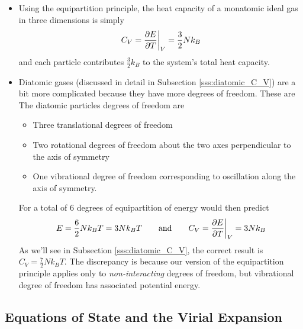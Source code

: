 \documentclass[11pt, a4paper]{article}
\newcommand{\eqtext}[1]{\qquad \text{#1} \qquad}
\begin{document}
\begin{itemize}
	\item Using the equipartition principle, the heat capacity of a monatomic ideal gas in three dimensions is simply
	\begin{equation*}
		C_{V} = \pdv{E}{T}\bigg|_{V} = \frac{3}{2}N k_{B}
	\end{equation*}
	and each particle contributes $ \frac{3}{2} k_{B} $ to the system's total heat capacity.
	
	\item Diatomic gases (discussed in detail in Subsection \ref{sss:diatomic_C_V}) are a bit more complicated because they have more degrees of freedom. These are
	The diatomic particles degrees of freedom are
	\begin{itemize}
		\item Three translational degrees of freedom
		\item Two rotational degrees of freedom about the two axes perpendicular to the axis of symmetry
		\item One vibrational degree of freedom corresponding to oscillation along the axis of symmetry.
	\end{itemize}
	For a total of 6 degrees of equipartition of energy would then predict 
	\begin{equation*}
		E = \frac{6}{2}Nk_{B}T = 3Nk_{B}T \eqtext{and} C_{V} = \pdv{E}{T}\bigg|_{V} = 3 N k_{B}
	\end{equation*}
	As we'll see in Subsection \ref{sss:diatomic_C_V}, the correct result is $ C_{V} = \frac{7}{2}Nk_{B}T$. The discrepancy is because our version of the equipartition principle applies only to \textit{non-interacting} degrees of freedom, but vibrational degree of freedom has associated potential energy. 
\end{itemize}




\subsection{Equations of State and the Virial Expansion}
\end{document}
